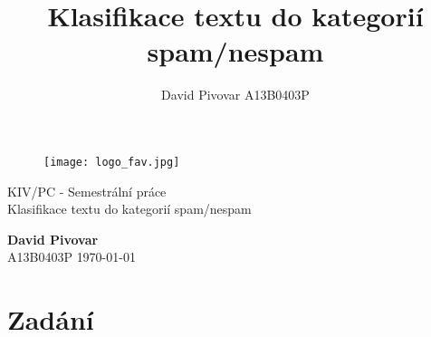 \documentclass[12pt, a4paper]{report}
\title{Klasifikace textu do kategorií spam/nespam}
\author{David Pivovar A13B0403P}
\begin{document}
\begin{titlepage}

\begin{figure}[t]
\centering
	\texttt{[image: logo\_fav.jpg]}
	\label{fig:logo_fav}
\end{figure}

\begin{center}
	{\large KIV/PC - Semestrální práce\\[0.3cm]}
	{\huge Klasifikace textu do kategorií spam/nespam \\[1.7cm] }
\end{center}

\vfill

\begin{flushleft}
	{\large \textbf{David Pivovar}\\}
	{\large A13B0403P}
	\hfill
	{\large \today}
\end{flushleft}

\end{titlepage}


\tableofcontents


\chapter{Zadání}
\end{document}
